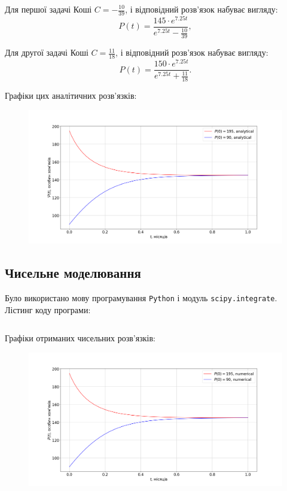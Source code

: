 Для першої задачі Коші $C = - \frac{10}{39}$, і відповідний розв'язок набуває вигляду:
\begin{equation*}
	P(t) = \frac{145 \cdot e^{7.25 t}}{e^{7.25 t} - \frac{10}{39}},
\end{equation*}

Для другої задачі Коші $C = \frac{11}{18}$, і відповідний розв'язок набуває вигляду:
\begin{equation*}
	P(t) = \frac{150 \cdot e^{7.25 t}}{e^{7.25 t}  + \frac{11}{18}}.
\end{equation*}

Графіки цих аналітичних розв'язків:
\begin{figure}[H]
	\centering
	\includegraphics[width=\textwidth]{1_analytical.png}
\end{figure}

\subsection{Чисельне моделювання}

Було використано мову програмування \texttt{Python} і модуль \texttt{scipy.integrate}. Лістинг коду програми:
\inputminted{python}{1_numerical.py}

Графіки отриманих чисельних розв'язків:
\begin{figure}[H]
	\centering
	\includegraphics[width=\textwidth]{1_numerical.png}
\end{figure}

